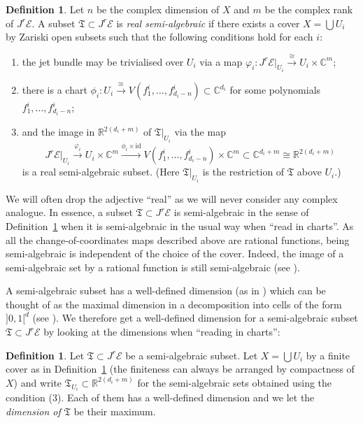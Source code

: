 \documentclass[a4paper]{amsart}
\newcommand{\bR}{\mathbb R}
\newcommand{\bC}{\mathbb C}
\newcommand{\cE}{\mathcal E}
\newcommand{\fT}{\mathfrak T}
\newcommand{\lra}{\longrightarrow}
\theoremstyle{plain}
\theoremstyle{definition}
\newtheorem{definition}[theorem]{Definition}
\begin{document}
\begin{definition}\label{def:semialgebraic}
Let $n$ be the complex dimension of $X$ and $m$ be the complex rank of $J^r\cE$. A subset $\fT \subset J^r\cE$ is \emph{real semi-algebraic} if there exists a cover $X = \bigcup U_i$ by Zariski open subsets such that the following conditions hold for each $i$:
\begin{enumerate}
    \item the jet bundle may be trivialised over $U_i$ via a map $\varphi_i \colon J^r\cE|_{U_i} \overset{\cong}{\to} U_i \times \bC^m$;
    \item there is a chart $\phi_i \colon U_i \overset{\cong}{\to} V(f^i_1,\ldots,f^i_{d_i-n}) \subset \bC^{d_i}$ for some polynomials $f^i_1,\ldots,f^i_{d_i-n}$;
    \item and the image in $\bR^{2(d_i + m)}$ of $\fT|_{U_i}$ via the map
    \[
        J^r\cE|_{U_i} \overset{\varphi_i}{\lra} U_i \times \bC^m \overset{\phi_i \times \mathrm{id}}{\lra} V(f^i_1,\ldots,f^i_{d_i-n}) \times \bC^m \subset \bC^{d_i + m} \cong \bR^{2(d_i + m)}
    \]
    is a real semi-algebraic subset. (Here $\fT|_{U_i}$ is the restriction of $\fT$ above $U_i$.)
\end{enumerate}
\end{definition}
We will often drop the adjective ``real'' as we will never consider any complex analogue. In essence, a subset $\fT \subset J^r\cE$ is semi-algebraic in the sense of Definition~\ref{def:semialgebraic} when it is semi-algebraic in the usual way when ``read in charts''. As all the change-of-coordinates maps described above are rational functions, being semi-algebraic is independent of the choice of the cover. Indeed, the image of a semi-algebraic set by a rational function is still semi-algebraic (see \cite[Section 2.2]{bochnak_real_1998}). 

A semi-algebraic subset has a well-defined dimension (as in \cite[Section 2.8]{bochnak_real_1998}) which can be thought of as the maximal dimension in a decomposition into cells of the form $]0,1[^d$ (see \cite[Corollary 2.8.9]{bochnak_real_1998}). We therefore get a well-defined dimension for a semi-algebraic subset $\fT \subset J^r\cE$ by looking at the dimensions when ``reading in charts'':
\begin{definition}
Let $\fT \subset J^r\cE$ be a semi-algebraic subset. Let $X = \bigcup U_i$ by a finite cover as in Definition~\ref{def:semialgebraic} (the finiteness can always be arranged by compactness of $X$) and write $\fT_{U_i} \subset \bR^{2(d_i + m)}$ for the semi-algebraic sets obtained using the condition (3). Each of them has a well-defined dimension and we let the \emph{dimension of} $\fT$ be their maximum.
\end{definition}
\end{document}
